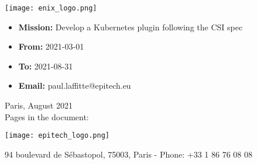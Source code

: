 \pagestyle{fancy}
\thispagestyle{empty}

\begin{spacing}{1.5}
    \center
    \texttt{[image: enix\_logo.png]}\\
    \vspace{0.5 cm}
    {\fontsize{16}{18}\selectfont {}}
\end{spacing}

\vspace{1 cm}
\noindent\begin{minipage}[t]{6cm}
    \begin{itemize}[label=, leftmargin=*, itemsep=0pt]
        \item \textbf{Mission:} Develop a Kubernetes plugin following the CSI spec
        \item \textbf{From:   } 2021-03-01
        \item \textbf{To:     } 2021-08-31
        \item \textbf{Email:  } paul.laffitte@epitech.eu
    \end{itemize}
\end{minipage}
\hfill
\begin{minipage}[t]{5.4cm}
    \begin{flushleft}
        \begin{spacing}{1.8}
            Paris, August 2021\\
            Pages in the document: \pageref{LastPage}
        \end{spacing}
    \end{flushleft}
\end{minipage}

\vspace{1cm}

\begin{flushright}
    {\Huge \title\\}
    \hrulefill \\ \vspace{0.5 cm}
    {\LARGE \subtitle}
\end{flushright}
\vspace{1.5 cm}

\begin{center}
    \texttt{[image: epitech\_logo.png]}
    \vspace{0.5 cm}

    \vspace{4.5cm}

    {\scriptsize 94 boulevard de Sébastopol, 75003, Paris - Phone: +33 1 86 76 08 08}
\end{center}

\newpage
